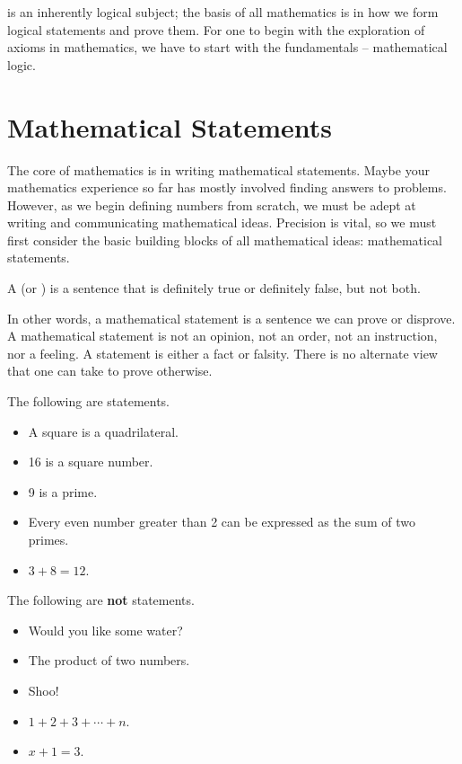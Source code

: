  is an inherently logical subject; the basis of all mathematics is in how we form logical statements and prove them. For one to begin with the exploration of axioms in mathematics, we have to start with the fundamentals -- mathematical logic.

\section{Mathematical Statements}
The core of mathematics is in writing mathematical statements. Maybe your mathematics experience so far has mostly involved finding answers to problems. However, as we begin defining numbers from scratch, we must be adept at writing and communicating mathematical ideas. Precision is vital, so we must first consider the basic building blocks of all mathematical ideas: mathematical statements.

\begin{definition}[Statements]
    A  (or ) is a sentence that is definitely true or definitely false, but not both.
\end{definition}

In other words, a mathematical statement is a sentence we can prove or disprove. A mathematical statement is not an opinion, not an order, not an instruction, nor a feeling. A statement is either a fact or falsity. There is no alternate view that one can take to prove otherwise.

\begin{example}
    The following are statements.
    \begin{itemize}
        \item A square is a quadrilateral.
        \item 16 is a square number.
        \item 9 is a prime.
        \item Every even number greater than 2 can be expressed as the sum of two primes.
        \item $3 + 8 = 12$.
    \end{itemize}

    \newpage

    The following are \textbf{not} statements.
    \begin{itemize}
        \item Would you like some water?
        \item The product of two numbers.
        \item Shoo!
        \item $1 + 2 + 3 + \cdots + n$.
        \item $x + 1 = 3$.
    \end{itemize}
\end{example}

